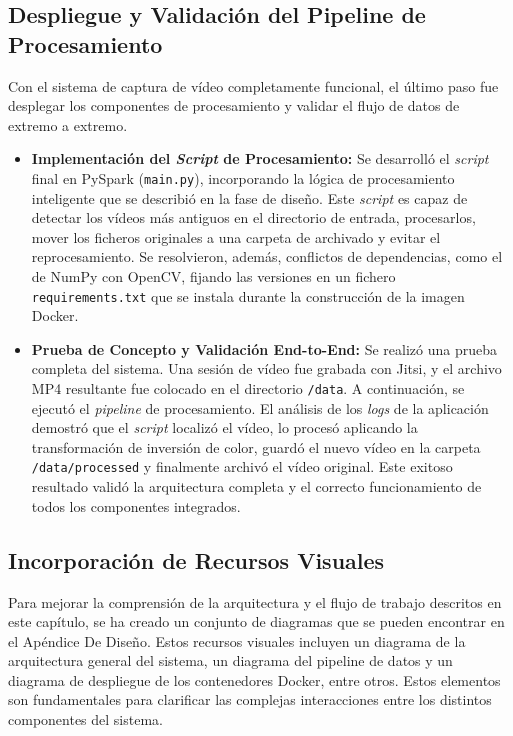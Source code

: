 \subsection{Despliegue y Validación del Pipeline de Procesamiento}
Con el sistema de captura de vídeo completamente funcional, el último paso fue desplegar los componentes de procesamiento y validar el flujo de datos de extremo a extremo.
\begin{itemize}
    \item \textbf{Implementación del \textit{Script} de Procesamiento:} Se desarrolló el \textit{script} final en PySpark (\texttt{main.py}), incorporando la lógica de procesamiento inteligente que se describió en la fase de diseño. Este \textit{script} es capaz de detectar los vídeos más antiguos en el directorio de entrada, procesarlos, mover los ficheros originales a una carpeta de archivado y evitar el reprocesamiento. Se resolvieron, además, conflictos de dependencias, como el de NumPy con OpenCV, fijando las versiones en un fichero \texttt{requirements.txt} que se instala durante la construcción de la imagen Docker.
    
    \item \textbf{Prueba de Concepto y Validación End-to-End:} Se realizó una prueba completa del sistema. Una sesión de vídeo fue grabada con Jitsi, y el archivo MP4 resultante fue colocado en el directorio \texttt{/data}. A continuación, se ejecutó el \textit{pipeline} de procesamiento. El análisis de los \textit{logs} de la aplicación demostró que el \textit{script} localizó el vídeo, lo procesó aplicando la transformación de inversión de color, guardó el nuevo vídeo en la carpeta \texttt{/data/processed} y finalmente archivó el vídeo original. Este exitoso resultado validó la arquitectura completa y el correcto funcionamiento de todos los componentes integrados.
\end{itemize}

\subsection{Incorporación de Recursos Visuales}
Para mejorar la comprensión de la arquitectura y el flujo de trabajo descritos en este capítulo, se ha creado un conjunto de diagramas que se pueden encontrar en el Apéndice De Diseño. Estos recursos visuales incluyen un diagrama de la arquitectura general del sistema, un diagrama del pipeline de datos y un diagrama de despliegue de los contenedores Docker, entre otros. Estos elementos son fundamentales para clarificar las complejas interacciones entre los distintos componentes del sistema.

